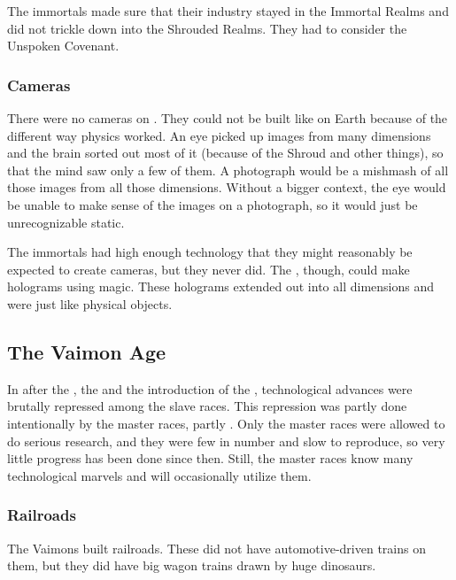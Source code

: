 The immortals made sure that their industry stayed in the Immortal Realms and did not trickle down into the Shrouded Realms.
They had to consider the Unspoken Covenant.





\subsubsection{Cameras}
There were no cameras on \Miith. 
They could not be built like on Earth because of the different way \Miithian physics worked. 
An eye picked up images from many dimensions and the brain sorted out most of it (because of the Shroud and other things), so that the mind saw only a few of them. 
A photograph would be a mishmash of all those images from all those dimensions. 
Without a bigger context, the eye would be unable to make sense of the images on a photograph, so it would just be unrecognizable static. 

The immortals had high enough technology that they might reasonably be expected to create cameras, but they never did. 
The \ophidians, though, could make holograms using magic. 
These holograms extended out into all dimensions and were just like physical objects. 











\subsection{The Vaimon Age}
In \Azmith after the , the  and the introduction of the \charade, technological advances were brutally repressed among the slave races. 
This repression was partly done intentionally by the master races, partly .
Only the master races were allowed to do serious research, and they were few in number and slow to reproduce, so very little progress has been done since then. 
Still, the master races know many technological marvels and will occasionally utilize them. 





\subsubsection{Railroads}
The Vaimons built railroads. 
These did not have automotive-driven trains on them, but they did have big wagon trains drawn by huge dinosaurs.





